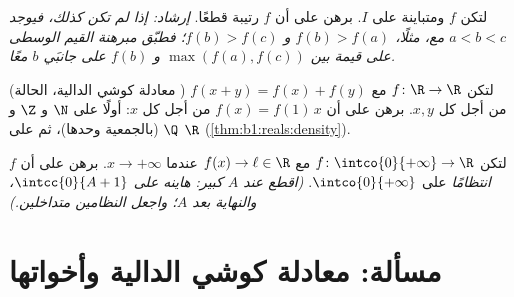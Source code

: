 \begin{exercise}[$\star\star\star$]\label{exo:b1:continuity:10}
لتكن $f$  ومتباينة على  $I$. برهن على أن
$f$ رتيبة قطعًا. \emph{إرشاد: إذا لم تكن كذلك، فيوجد $a < b < c$
مع، مثلًا، $f(b) > f(a)$ و $f(b) > f(c)$؛ فطبّق مبرهنة القيم
الوسطى على قيمة بين $\max(f(a), f(c))$ و $f(b)$ على
جانبَي $b$ معًا.}
\end{exercise}

\begin{exercise}[$\star\star\star$]\label{exo:b1:continuity:11}
(معادلة كوشي الدالية، الحالة ) لتكن $f \colon \R \to
\R$  مع $f(x + y) = f(x) + f(y)$ من أجل كل $x, y$.
برهن على أن $f(x) = f(1)\,x$ من أجل كل $x$: أولًا على $\N$ و $\Z$ و $\Q$
(بالجمعية وحدها)، ثم على $\R$  
(\cref{thm:b1:reals:density}).
\end{exercise}

\begin{exercise}[$\star\star\star$]\label{exo:b1:continuity:12}
لتكن $f \colon \intco{0}{+\infty} \to \R$  مع
$f(x) \to \ell \in \R$ عندما $x \to +\infty$. برهن على أن $f$
 \emph{انتظامًا} على $\intco{0}{+\infty}$. \emph{(اقطع عند
$A$ كبير: هاينه على $\intcc{0}{A+1}$، والنهاية بعد $A$؛ واجعل
النظامين متداخلين.)}
\end{exercise}

\section{مسألة: معادلة كوشي الدالية وأخواتها}

